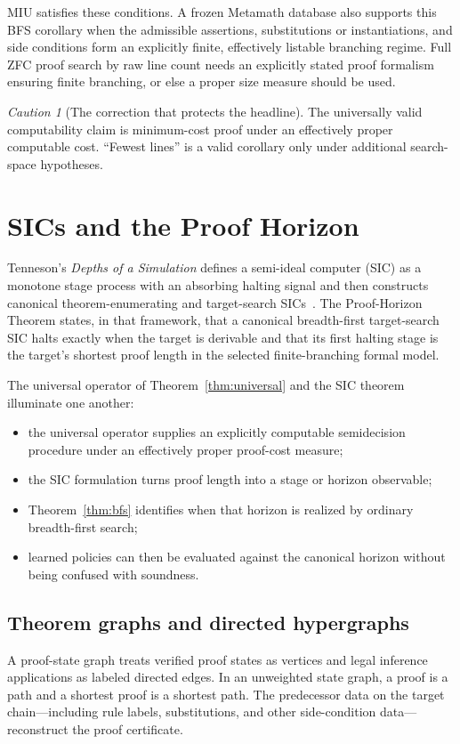 \documentclass[11pt,oneside]{book}
\theoremstyle{definition}
\theoremstyle{remark}
\newtheorem{caution}[theorem]{Caution}
\begin{document}
MIU satisfies these conditions. A frozen Metamath database also supports this BFS corollary when the admissible assertions, substitutions or instantiations, and side conditions form an explicitly finite, effectively listable branching regime. Full ZFC proof search by raw line count needs an explicitly stated proof formalism ensuring finite branching, or else a proper size measure should be used.

\begin{caution}[The correction that protects the headline]
The universally valid computability claim is minimum-cost proof under an effectively proper computable cost. ``Fewest lines'' is a valid corollary only under additional search-space hypotheses.
\end{caution}

\chapter{SICs and the Proof Horizon}
Tenneson's \emph{Depths of a Simulation} defines a semi-ideal computer (SIC) as a monotone stage process with an absorbing halting signal and then constructs canonical theorem-enumerating and target-search SICs~\cite{tennesonSIC}. The Proof-Horizon Theorem states, in that framework, that a canonical breadth-first target-search SIC halts exactly when the target is derivable and that its first halting stage is the target's shortest proof length in the selected finite-branching formal model.

The universal operator of Theorem~\ref{thm:universal} and the SIC theorem illuminate one another:
\begin{itemize}
\item the universal operator supplies an explicitly computable semidecision procedure under an effectively proper proof-cost measure;
\item the SIC formulation turns proof length into a stage or horizon observable;
\item Theorem~\ref{thm:bfs} identifies when that horizon is realized by ordinary breadth-first search;
\item learned policies can then be evaluated against the canonical horizon without being confused with soundness.
\end{itemize}

\section{Theorem graphs and directed hypergraphs}
A proof-state graph treats verified proof states as vertices and legal inference applications as labeled directed edges. In an unweighted state graph, a proof is a path and a shortest proof is a shortest path. The predecessor data on the target chain---including rule labels, substitutions, and other side-condition data---reconstruct the proof certificate.
\end{document}
